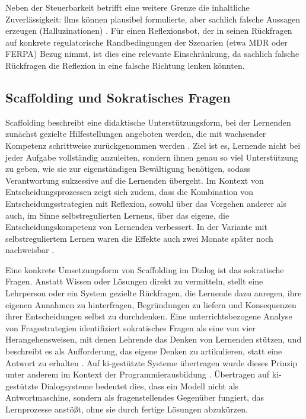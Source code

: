 Neben der Steuerbarkeit betrifft eine weitere Grenze die inhaltliche Zuverlässigkeit: \glspl{llm}
können plausibel formulierte, aber sachlich falsche Aussagen erzeugen (Halluzinationen)
\cite{jiSurveyHallucinationNatural2023}. Für einen Reflexionsbot, der in seinen Rückfragen auf
konkrete regulatorische Randbedingungen der Szenarien (etwa MDR oder FERPA) Bezug nimmt, ist dies eine
relevante Einschränkung, da sachlich falsche Rückfragen die Reflexion in eine falsche Richtung lenken
könnten.

\subsection{Scaffolding und Sokratisches Fragen}
\label{sec:ScaffoldingUndSokratischesFragen}
Scaffolding beschreibt eine didaktische Unterstützungsform, bei der Lernenden zunächst gezielte
Hilfestellungen angeboten werden, die mit wachsender Kompetenz schrittweise zurückgenommen werden
\cite{woodRoleTutoringProblem1976, vandepolScaffoldingTeacherStudent2010}. Ziel ist es, Lernende nicht bei jeder Aufgabe
vollständig anzuleiten, sondern ihnen genau so viel Unterstützung zu geben, wie sie zur
eigenständigen Bewältigung benötigen, sodass Verantwortung sukzessive auf die Lernenden übergeht.
Im Kontext von Entscheidungsprozessen zeigt sich zudem, dass die Kombination von
Entscheidungsstrategien mit Reflexion, sowohl über das Vorgehen anderer als auch, im Sinne
selbstregulierten Lernens, über das eigene, die Entscheidungskompetenz von Lernenden verbessert. In
der Variante mit selbstreguliertem Lernen waren die Effekte auch zwei Monate später noch nachweisbar
\cite{greschEnhancingDecisionMakingSTSE2017}.

Eine konkrete Umsetzungsform von Scaffolding im Dialog ist das sokratische Fragen. Anstatt Wissen
oder Lösungen direkt zu vermitteln, stellt eine Lehrperson oder ein System gezielte
Rückfragen, die Lernende dazu anregen, ihre eigenen Annahmen zu hinterfragen, Begründungen zu
liefern und Konsequenzen ihrer Entscheidungen selbst zu durchdenken. Eine unterrichtsbezogene
Analyse von Fragestrategien identifiziert sokratisches Fragen als eine von vier Herangehensweisen,
mit denen Lehrende das Denken von Lernenden stützen, und beschreibt es als Aufforderung, das eigene
Denken zu artikulieren, statt eine Antwort zu erhalten \cite{chinTeacherQuestioningScience2007}.
Auf \gls{ki}-gestützte Systeme übertragen wurde dieses Prinzip unter anderem im Kontext der
Programmierausbildung \cite{karguptaInstructNotAssist2024}.
Übertragen auf \gls{ki}-gestützte Dialogsysteme bedeutet dies, dass ein Modell nicht als
Antwortmaschine, sondern als fragenstellendes Gegenüber fungiert, das Lernprozesse anstößt, ohne
sie durch fertige Lösungen abzukürzen.

